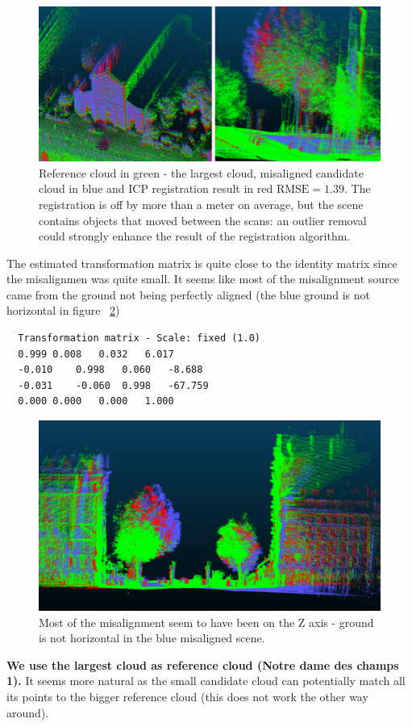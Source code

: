\documentclass[a4paper]{article}
\begin{document}
\pagebreak

\begin{figure}[ht]
    \centering
    \includegraphics[width=0.8\linewidth]{figures/notre_dame_des_champs_registration.png}
    \caption{Reference cloud in green - the largest cloud, misaligned candidate cloud in blue and ICP registration result in red $\text{RMSE}=1.39$. The registration is off by more than a meter on average, but the scene contains objects that moved between the scans: an outlier removal could strongly enhance the result of the registration algorithm.}
    \label{fig:CC_notredame}
\end{figure}

The estimated transformation matrix is quite close to the identity matrix since the misalignmen was quite small. It seems like most of the misalignment source came from the ground not being perfectly aligned (the blue ground is not horizontal in figure ~\ref{fig:CC_notredame_z})
\begin{verbatim}
  Transformation matrix - Scale: fixed (1.0)
  0.999	0.008	0.032	6.017
  -0.010	0.998	0.060	-8.688
  -0.031	-0.060	0.998	-67.759
  0.000	0.000	0.000	1.000
\end{verbatim}

\begin{figure}[ht]
    \centering
    \includegraphics[width=0.8\linewidth]{figures/notre_dame_des_champs_registration_rotation.png}
    \caption{Most of the misalignment seem to have been on the Z axis - ground is not horizontal in the blue misaligned scene.}
    \label{fig:CC_notredame_z}
\end{figure}
\textbf{We use the largest cloud as reference cloud (Notre dame des champs 1).} It seems more natural as the small candidate cloud can potentially match all its points to the bigger reference cloud (this does not work the other way around).
\end{document}
